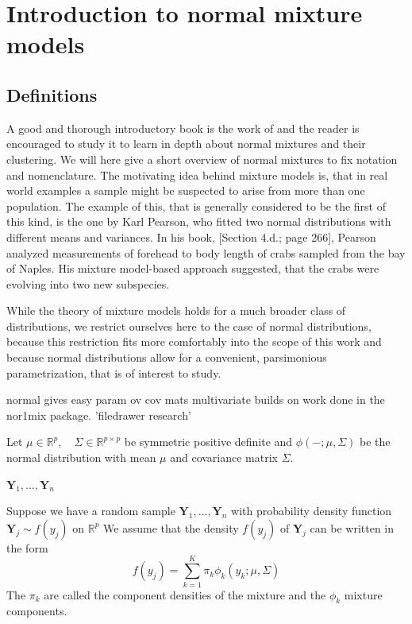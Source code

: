 \chapter{Introduction to normal mixture models}


\section{Definitions}

A good and thorough introductory book is the work of \cite{McL00} and
the reader is encouraged to study it to learn in depth about normal mixtures
and their clustering. 
We will here give a short overview of normal mixtures to fix notation and 
nomenclature.
The motivating idea behind mixture models is, that in real world examples
a sample might be suspected to arise from more than one population.
The example of this, that is generally considered to be the first of this kind,
is the one by Karl Pearson, who fitted two normal distributions with different 
means and variances.
In his book, \cite{Pea96}[Section 4.d.; page 266], Pearson analyzed measurements
of forehead to body length of crabs sampled from the bay of Naples. His mixture 
model-based approach suggested, that the crabs were evolving into two new 
subspecies.

While the theory of mixture models holds for a much broader class of 
distributions, we restrict ourselves here to the case of normal distributions,
because this restriction fits more comfortably into the scope of this work and 
because normal distributions allow for a convenient, parsimonious 
parametrization, that is of interest to study.

normal gives easy param ov cov mats
multivariate builds on work done in the nor1mix package. 'filedrawer research'

Let $ \mu \in \mathbb{R}^p , \quad \Sigma \in \mathbb{R}^{p \times p} $ be
symmetric positive definite and $ \phi(- ; \mu, \Sigma) $ be the normal 
distribution with mean $ \mu $ and covariance matrix $ \Sigma $.


$ \pmb{Y}_1, \dots , \pmb{Y}_n $

\begin{definition}
    Suppose we have a random sample $ \pmb{Y}_1, \dots , \pmb{Y}_n $ with 
    probability density function $ \pmb{Y}_j \sim f(y_j) $ on 
    $\mathbb{R}^p$ We assume that the density $ f(y_j) $ of $ \pmb{Y}_j $ can 
    be written in the form 
    \[ f(y_j) = \sum_{k=1}^{K} \pi_k \phi_k (y_k; \mu, \Sigma) \]
    The $ \pi_k $ are called the component densities of the mixture and the 
    $\phi_k$ mixture components.
\end{definition}

